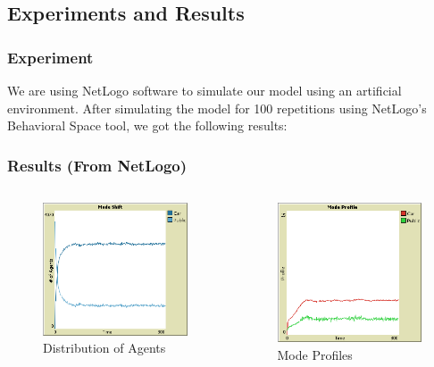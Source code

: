 \documentclass[aspectratio=169]{beamer}
\begin{document}
\subsection{Experiments and Results}
\begin{frame}
\frametitle{Experiment}
We are using NetLogo software to simulate our model using an artificial environment. After simulating the model for 100 repetitions using NetLogo's \alert{Behavioral Space} tool, we got the following results:
\end{frame}

\begin{frame}
\frametitle{Results (From NetLogo)}
\begin{columns}[c]
  \column{2in}  %
  \begin{figure}
  \includegraphics[width=5cm]{Simulation 1 mode shift}
  \caption{Distribution of Agents}
  \end{figure}
 
  \column{2in}
   \begin{figure}

	\includegraphics[width=5cm]{Simulation 1 mode profile}

\caption{Mode Profiles}
\end{figure}

 \end{columns}
\end{frame}
\end{document}
